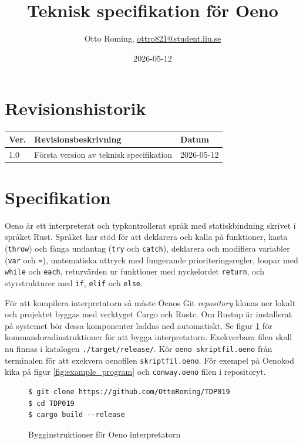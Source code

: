 \documentclass{TDP003mall}
\author{Otto Roming, \url{ottro821@student.liu.se}}
\title{Teknisk specifikation för Oeno}
\date{2026-05-12}
\begin{document}
\projectpage
\section{Revisionshistorik}
\begin{table}[!h]
\begin{tabularx}{\linewidth}{|l|X|l|}
\hline
Ver. & Revisionsbeskrivning & Datum \\\hline
1.0 & Första version av teknisk specifikation & 2026-05-12 \\\hline
\end{tabularx}
\end{table}

\section{Specifikation}
Oeno är ett interpreterat och typkontrollerat språk med statiskbindning skrivet i språket Rust. Språket har stöd för att deklarera och kalla på funktioner, kasta (\texttt{throw}) och fånga undantag (\texttt{try} och \texttt{catch}), deklarera och modifiera variabler (\texttt{var} och \texttt{=}), matematiska uttryck med fungerande prioriteringsregler, loopar med \texttt{while} och \texttt{each}, returvärden ur funktioner med nyckelordet \texttt{return}, och styrstrukturer med \texttt{if}, \texttt{elif} och \texttt{else}.

För att kompilera interpretatorn så måste Oenos Git \textit{repository} klonas ner lokalt och projektet byggas med verktyget Cargo och Rustc. Om Rustup är installerat på systemet bör dessa komponenter laddas ned automatiskt. Se figur \ref{fig:build_instructions} för kommandoradinstruktioner för att bygga interpretatorn. Exekverbara filen skall nu finnas i katalogen \texttt{./target/release/}. Kör \texttt{oeno skriptfil.oeno} från terminalen för att exekvera oenofilen \texttt{skriptfil.oeno}. För exempel på Oenokod kika på figur \ref{fig:example_program} och \texttt{conway.oeno} filen i repositoryt.

\begin{figure}[H]
    \centering
    \begin{minipage}{0.6\linewidth}
    \begin{verbatim}
$ git clone https://github.com/OttoRoming/TDP019
$ cd TDP019
$ cargo build --release
    \end{verbatim}
    \end{minipage}
    \caption{Bygginstruktioner för Oeno interpretatorn}
    \label{fig:build_instructions}
\end{figure}
\end{document}
